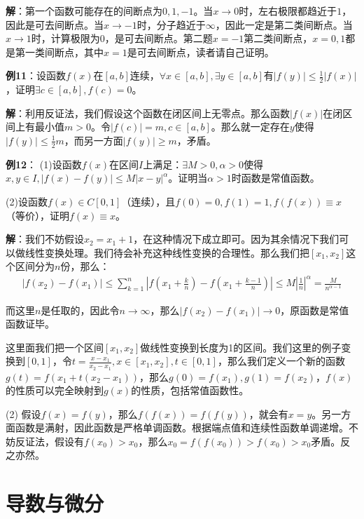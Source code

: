 \documentclass{ctexart}
\let\oldtextbf\textbf %
\renewcommand{\textbf}[1]{\textcolor{btex}{\oldtextbf{#1}}} %
\begin{document}
\textbf{解}：第一个函数可能存在的间断点为$0,1,-1$。当$x\to 0$时，左右极限都趋近于$1$，因此是可去间断点。当$x\to -1$时，分子趋近于$\infty$，因此一定是第二类间断点。当$x\to 1$时，计算极限为$0$，是可去间断点。第二题$x=-1$第二类间断点，$x=0,1$都是第一类间断点，其中$x=1$是可去间断点，读者请自己证明。

\textbf{例11}：设函数$f(x)$在$[a,b]$连续，$\forall x\in[a,b],\exists y\in[a,b]$有$|f(y)|\leq \frac{1}{2}|f(x)|$，证明$\exists c\in[a,b],f(c)=0$。

\textbf{解}：利用反证法，我们假设这个函数在闭区间上无零点。那么函数$|f(x)|$在闭区间上有最小值$m>0$。令$|f(c)|=m,c\in[a,b]$。那么就一定存在$y$使得$|f(y)|\leq \frac{1}{2}m$，而另一方面$|f(y)|\geq m$，矛盾。

\textbf{例12}： (1)设函数$f(x)$在区间$I$上满足：$\exists M>0,\alpha>0$使得$x,y\in I,|f(x)-f(y)|\leq M|x-y|^\alpha$。证明当$\alpha>1$时函数是常值函数。

(2)设函数$f(x)\in C[0,1]$（连续），且$f(0)=0,f(1)=1,f(f(x))\equiv x$（等价），证明$f(x)\equiv x$。

\textbf{解}：我们不妨假设$x_2=x_1+1$，在这种情况下成立即可。因为其余情况下我们可以做线性变换处理。我们待会补充这种线性变换的合理性。那么我们把$[x_1,x_2]$这个区间分为$n$份，那么：
\begin{align*}
    |f(x_2)-f(x_1)|\leq\sum_{k=1}^n|f(x_1+\frac{k}{n})-f(x_1+\frac{k-1}{n})|\leq M|\frac{1}{n}|^\alpha=\frac{M}{n^{\alpha-1}}
\end{align*}

而这里$n$是任取的，因此令$n\to\infty$，那么$|f(x_2)-f(x_1)|\to 0$，原函数是常值函数证毕。
\begin{tcolorbox}[
    colback=bac2,     %
    colframe=fra2,   %
    coltitle=white,             %
    coltext=tex2,
    title=线性变换的合理性,
    fonttitle=\bfseries,        %
arc=3mm,                     %
breakable
]
这里面我们把一个区间$[x_1,x_2]$做线性变换到长度为1的区间。我们这里的例子变换到$[0,1]$，令$t=\frac{x-x_1}{x_2-x_1},x\in[x_1,x_2],t\in[0,1]$，那么我们定义一个新的函数$g(t)=f(x_1+t(x_2-x_1))$，那么$g(0)=f(x_1),g(1)=f(x_2)$，$f(x)$的性质可以完全映射到$g(x)$的性质，包括常值函数性。
\end{tcolorbox}

(2) 假设$f(x)=f(y)$，那么$f(f(x))=f(f(y))$，就会有$x=y$。另一方面函数是满射，因此函数是严格单调函数。根据端点值和连续性函数单调递增。不妨反证法，假设有$f(x_0)>x_0$，那么$x_0=f(f(x_0))>f(x_0)>x_0$矛盾。反之亦然。

\section{导数与微分}
\end{document}
